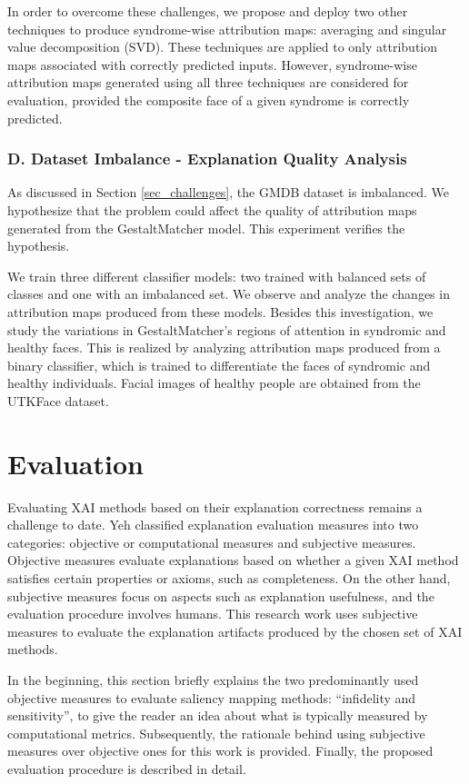 \documentclass[../report.tex]{subfiles}
\begin{document}
    In order to overcome these challenges, we propose and deploy two other techniques to produce syndrome-wise attribution maps: averaging and singular value decomposition (SVD). These techniques are applied to only attribution maps associated with correctly predicted inputs. However, syndrome-wise attribution maps generated using all three techniques are considered for evaluation, provided the composite face of a given syndrome is correctly predicted.
    \subsubsection{D. Dataset Imbalance - Explanation Quality Analysis} \label{sec_data_imb}
    As discussed in Section \ref{sec_challenges}, the GMDB dataset is imbalanced. We hypothesize that the problem could affect the quality of attribution maps generated from the GestaltMatcher model. This experiment verifies the hypothesis.
    
    We train three different classifier models: two trained with balanced sets of classes and one with an imbalanced set. We observe and analyze the changes in attribution maps produced from these models. Besides this investigation, we study the variations in GestaltMatcher's regions of attention in syndromic and healthy faces. This is realized by analyzing attribution maps produced from a binary classifier, which is trained to differentiate the faces of syndromic and healthy individuals. Facial images of healthy people are obtained from the UTKFace dataset.
    \section{Evaluation}\label{sec_evaluation}
    Evaluating XAI methods based on their explanation correctness remains a challenge to date. Yeh \etal \cite{yeh2019fidelity} classified explanation evaluation measures into two categories: objective or computational measures and subjective measures. Objective measures evaluate explanations based on whether a given XAI method satisfies certain properties or axioms, such as completeness\cite{sundararajan2017axiomatic}. On the other hand, subjective measures focus on aspects such as explanation usefulness, and the evaluation procedure involves humans. This research work uses subjective measures to evaluate the explanation artifacts produced by the chosen set of XAI methods.
    
    In the beginning, this section briefly explains the two predominantly used objective measures to evaluate saliency mapping methods: \enquote{infidelity and sensitivity}\cite{yeh2019fidelity}, to give the reader an idea about what is typically measured by computational metrics. Subsequently, the rationale behind using subjective measures over objective ones for this work is provided. Finally, the proposed evaluation procedure is described in detail.
\end{document}
